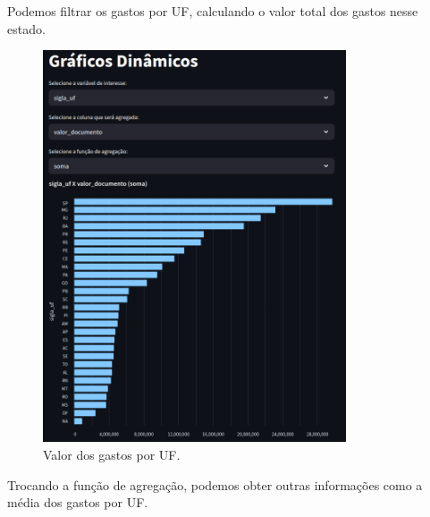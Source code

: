 \documentclass[12pt, a4paper]{article}
\begin{document}
Podemos filtrar os gastos por UF, calculando o valor total dos gastos nesse estado.

\begin{figure}[!htbp]
	\centering
	\includegraphics[width=0.8\textwidth]{assets/2_plot7.png}
	\caption{Valor dos gastos por UF.}
	\label{fig:criacao_postgresql}
\end{figure}
\newpage

Trocando a função de agregação, podemos obter outras informações como a média dos gastos por UF.
\end{document}
